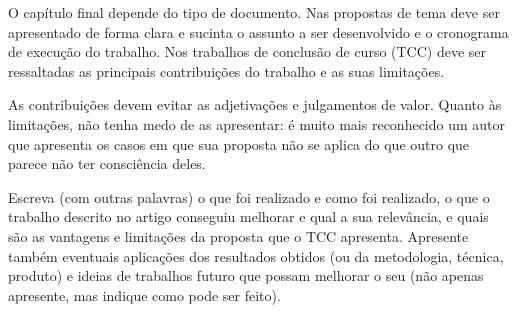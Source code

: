 
\label{Cap:Conclusao}

O capítulo final depende do tipo de documento. Nas propostas de tema
deve ser apresentado de forma clara e sucinta o assunto a ser
desenvolvido e o cronograma de execução do trabalho. Nos trabalhos de conclusão de curso (TCC) deve ser ressaltadas as principais contribuições do
trabalho e as suas limitações.

As contribuições devem evitar as adjetivações e julgamentos de valor.
Quanto às limitações, não tenha medo de as apresentar: é muito mais
reconhecido um autor que apresenta os casos em que sua proposta não se
aplica do que outro que parece não ter consciência deles.

Escreva (com outras palavras) o que foi realizado e como foi realizado, o que o trabalho descrito no artigo conseguiu melhorar e qual a sua relevância, e quais são as vantagens e limitações da proposta que o TCC apresenta. Apresente também eventuais aplicações dos resultados obtidos (ou da metodologia, técnica, produto) e ideias de trabalhos futuro que possam melhorar o seu (não apenas apresente, mas indique como pode ser feito).

%
%
%
%

